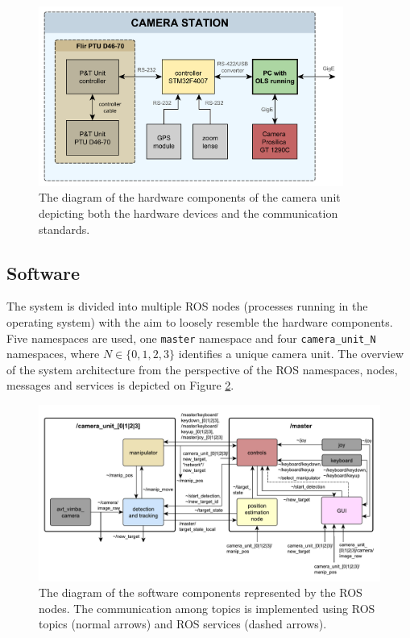 \begin{figure}[htb]
	\centering
	\includegraphics[width=10cm]{fig/hw_camera_unit.pdf}
	\caption{The diagram of the hardware components of the camera unit depicting both the hardware devices and the communication standards.}
	\label{fig:hw_camera_unit}
\end{figure}



\subsection{Software} \label{txt:software}

The system is divided into multiple ROS nodes (processes running in the operating system) with the aim to loosely resemble the hardware components. Five namespaces are used, one \texttt{master} namespace and four \texttt{camera\_unit\_N} namespaces, where $N \in \{0, 1, 2, 3\}$ identifies a unique camera unit. The overview of the system architecture from the perspective of the ROS namespaces, nodes, messages and services is depicted on Figure \ref{fig:sw_ols}.

\begin{figure}[htb]
	\centering
	\includegraphics[width=15.5cm]{fig/sw_ols.pdf}
	\caption{The diagram of the software components represented by the ROS nodes. The communication among topics is implemented using ROS topics (normal arrows) and ROS services (dashed arrows).}
	\label{fig:sw_ols}
\end{figure}

